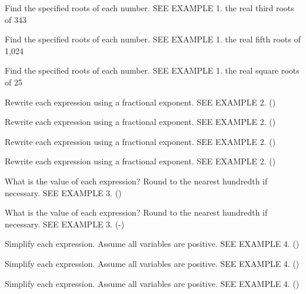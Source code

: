 \documentclass{article}
\newenvironment{practice}[2]{}{}        %
\newcommand{\answer}[1]{}               %
\begin{document}
\begin{practice}{26}{1}
Find the specified roots of each number. SEE EXAMPLE 1.
the real third roots of 343
\answer{7}
\end{practice}
\begin{practice}{27}{1}
Find the specified roots of each number. SEE EXAMPLE 1.
the real fifth roots of 1,024
\answer{4}
\end{practice}
\begin{practice}{28}{1}
Find the specified roots of each number. SEE EXAMPLE 1.
the real square roots of 25
\answer{(\pm5)}
\end{practice}
\begin{practice}{29}{1}
Rewrite each expression using a fractional exponent. SEE EXAMPLE 2.
()
\answer{(16^{\frac24}=16^{\frac12})}
\end{practice}
\begin{practice}{30}{1}
Rewrite each expression using a fractional exponent. SEE EXAMPLE 2.
()
\answer{(729^{\frac16})}
\end{practice}
\begin{practice}{31}{1}
Rewrite each expression using a fractional exponent. SEE EXAMPLE 2.
()
\answer{(x^{\frac27})}
\end{practice}
\begin{practice}{32}{1}
Rewrite each expression using a fractional exponent. SEE EXAMPLE 2.
()
\answer{((ab)^{\frac14})}
\end{practice}
\begin{practice}{33}{1}
What is the value of each expression? Round to the nearest hundredth if necessary. SEE EXAMPLE 3.
()
\answer{5}
\end{practice}
\begin{practice}{34}{1}
What is the value of each expression? Round to the nearest hundredth if necessary. SEE EXAMPLE 3.
(-)
\answer{(-3,125)}
\end{practice}
\begin{practice}{35}{1}
Simplify each expression. Assume all variables are positive. SEE EXAMPLE 4.
()
\answer{(2y^3)}
\end{practice}
\begin{practice}{36}{1}
Simplify each expression. Assume all variables are positive. SEE EXAMPLE 4.
()
\answer{(q^3z)}
\end{practice}
\begin{practice}{37}{1}
Simplify each expression. Assume all variables are positive. SEE EXAMPLE 4.
()
\answer{(3a^4b^3)}
\end{practice}
\end{document}
